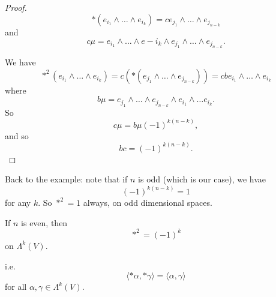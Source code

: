 \documentclass[notoc,notitlepage]{tufte-book}
\begin{document}
\begin{proof}
  \begin{equation*}
    *(e_{i_1} \land \hdots \land e_{i_k}) = c e_{j_1} \land \hdots \land
    e_{j_{n-k}}
  \end{equation*}
  and
  \begin{equation*}
    c \mu = e_{i_1} \land \hdots \land e-{i_k} \land e_{j_1} \land \hdots \land
    e_{j_{n-k}}.
  \end{equation*}

  We have
  \begin{equation*}
    *^2 (e_{i_1} \land \hdots \land e_{i_k}) = c ( * (e_{j_1} \land \hdots \land
    e_{j_{n-k}}) ) = cb e_{i_1} \land \hdots \land e_{i_k}
  \end{equation*}
  where
  \begin{equation*}
    b \mu = e_{j_1} \land \hdots \land e_{j_{n-k}} \land e_{i_1} \land \hdots
    e_{i_k}.
  \end{equation*}
  So
  \begin{equation*}
    c \mu = b \mu (-1)^{k(n-k)},
  \end{equation*}
  and so
  \begin{equation*}
    bc = (-1)^{k(n-k)}.
  \end{equation*}
\end{proof}

\begin{eg}
  Back to the example: note that if $n$ is odd (which is our case), we hvae
  \begin{equation*}
    (-1)^{k (n-k)} = 1
  \end{equation*}
  for any $k$. So $*^2 = 1$ always, on odd dimensional spaces.

  If $n$ is even, then
  \begin{equation*}
    *^2 = (-1)^k
  \end{equation*}
  on $\Lambda^k(V)$.
\end{eg}

\noindent
{} i.e.
\begin{equation*}
  \langle *\alpha, * \gamma \rangle = \langle \alpha, \gamma \rangle
\end{equation*}
for all $\alpha, \gamma \in \Lambda^k(V)$.
\end{document}
